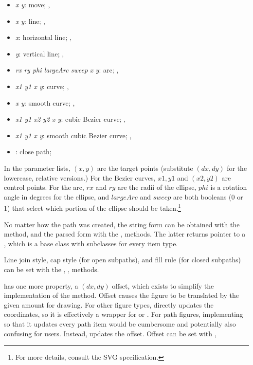 \begin{itemize}
\item {} \textit{x y}: move; , 
\item {} \textit{x y}: line; , 
\item {} \textit{x}: horizontal line; , 
\item {} \textit{y}: vertical line; , 
\item {} \textit{rx ry phi largeArc sweep x y}: arc; , 
\item {} \textit{x1 y1 x y}: curve; , 
\item {} \textit{x y}: smooth curve; , 
\item {} \textit{x1 y1 x2 y2 x y}: cubic Bezier curve; , 
\item {} \textit{x1 y1 x y}: smooth cubic Bezier curve; , 
\item {}: close path; 
\end{itemize}

In the parameter lists, $(x,y)$ are the target points (substitute $(dx,dy)$ for
the lowercase, relative versions.) For the Bezier curves, $x1,y1$ and
$(x2,y2)$ are control points. For the arc, $rx$ and $ry$ are the radii of the
ellipse, $phi$ is a rotation angle in degrees for the ellipse, and
$largeArc$ and $sweep$ are both booleans (0 or 1) that select which portion
of the ellipse should be taken.\footnote{For more details, consult the SVG
specification.}

No matter how the path was created, the string form can be obtained with the
 method, and the parsed form with the ,
 methods. The latter returns pointer to a
, which is a base class with subclasses for every
item type.

Line join style, cap style (for open subpaths), and fill rule (for closed
subpaths) can be set with the ,
,  methods.

 has one more property, a $(dx,dy)$ offset, which
exists to simplify the implementation of the  method. Offset
causes the figure to be translated by the given amount for drawing. For
other figure types,  directly updates the coordinates, so it
is effectively a wrapper for  or .
For path figures, implementing  so that it updates every path
item would be cumbersome and potentially also confusing for users. Instead,
 updates the offset. Offset can be set with
,

